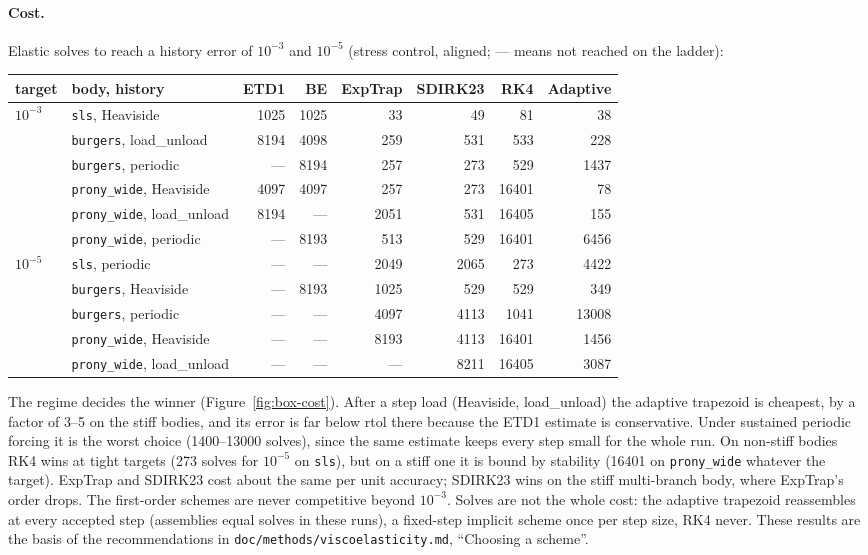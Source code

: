 \documentclass[11pt]{article}
\numberwithin{equation}{section}
\newcommand{\code}[1]{\texttt{#1}}
\begin{document}
\paragraph{Cost.}
Elastic solves to reach a history error of $10^{-3}$ and $10^{-5}$
(stress control, aligned; --- means not reached on the ladder):
\begin{center}
\small
\begin{tabular}{@{}llrrrrrr@{}}
\toprule
target & body, history & ETD1 & BE & ExpTrap & SDIRK23 & RK4 & Adaptive \\
\midrule
$10^{-3}$ & \code{sls}, Heaviside & 1025 & 1025 & 33 & 49 & 81 & 38 \\
 & \code{burgers}, load\_unload & 8194 & 4098 & 259 & 531 & 533 & 228 \\
 & \code{burgers}, periodic & --- & 8194 & 257 & 273 & 529 & 1437 \\
 & \code{prony\_wide}, Heaviside & 4097 & 4097 & 257 & 273 & 16401 & 78 \\
 & \code{prony\_wide}, load\_unload & 8194 & --- & 2051 & 531 & 16405 & 155 \\
 & \code{prony\_wide}, periodic & --- & 8193 & 513 & 529 & 16401 & 6456 \\
\midrule
$10^{-5}$ & \code{sls}, periodic & --- & --- & 2049 & 2065 & 273 & 4422 \\
 & \code{burgers}, Heaviside & --- & 8193 & 1025 & 529 & 529 & 349 \\
 & \code{burgers}, periodic & --- & --- & 4097 & 4113 & 1041 & 13008 \\
 & \code{prony\_wide}, Heaviside & --- & --- & 8193 & 4113 & 16401 & 1456 \\
 & \code{prony\_wide}, load\_unload & --- & --- & --- & 8211 & 16405 & 3087 \\
\bottomrule
\end{tabular}
\end{center}
The regime decides the winner (Figure~\ref{fig:box-cost}). After a step
load (Heaviside, load\_unload) the adaptive trapezoid is cheapest, by a
factor of 3--5 on the stiff bodies, and its error is far below rtol there
because the ETD1 estimate is conservative. Under sustained periodic
forcing it is the worst choice (1400--13000 solves), since the same
estimate keeps every step small for the whole run. On non-stiff bodies
RK4 wins at tight targets (273 solves for $10^{-5}$ on \code{sls}), but on
a stiff one it is bound by stability (16401 on \code{prony\_wide} whatever
the target). ExpTrap and SDIRK23 cost about the same per unit accuracy;
SDIRK23 wins on the stiff multi-branch body, where ExpTrap's order drops.
The first-order schemes are never competitive beyond $10^{-3}$. Solves are
not the whole cost: the adaptive trapezoid reassembles at every accepted
step (assemblies equal solves in these runs), a fixed-step implicit scheme
once per step size, RK4 never. These results are the basis of the
recommendations in \code{doc/methods/viscoelasticity.md}, ``Choosing a scheme''.
\end{document}
